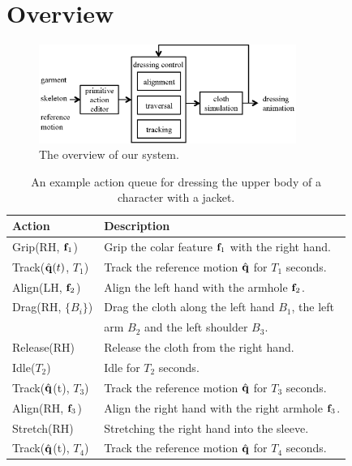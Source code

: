 \section{Overview}

\begin{figure}
  \centering
  \includegraphics[width=3.3in]{images/overview}
  \caption{The overview of our system.}
  \label{fig:overview}
\end{figure}

\begin{table}
  \centering
  \begin{tabular}{|l|l|}
    \hline
    Action & Description \\
    \hline
    Grip(RH, $\mathbf{f}_{1}$) & Grip the colar feature $\mathbf{f}_1$  with the right hand.\\
    Track($\hat{\mathbf{q}}(t)$, $T_1$) & Track the reference motion $\hat{\mathbf{q}}$ for $T_1$ seconds.\\
    Align(LH, $\mathbf{f}_{2}$) & Align the left hand with the armhole $\mathbf{f}_2$.\\
    Drag(RH, $\{B_i\}$) & Drag the cloth along the left hand $B_1$, the left\\
    &                      arm $B_2$ and the left shoulder $B_3$.\\
    Release(RH) & Release the cloth from the right hand.\\
    Idle($T_2$) & Idle for $T_2$ seconds.\\
    Track($\hat{\mathbf{q}}$(t), $T_3$) & Track the reference motion $\hat{\mathbf{q}}$ for $T_3$ seconds.\\
    Align(RH, $\mathbf{f}_{3}$) & Align the right hand with the right armhole $\mathbf{f}_3$.\\
    Stretch(RH) & Stretching the right hand into the sleeve.\\
    Track($\hat{\mathbf{q}}$(t), $T_4$) & Track the reference motion $\hat{\mathbf{q}}$ for $T_4$ seconds. \\
    \hline
  \end{tabular}
  \caption{An example action queue for dressing the upper body of a character with a jacket.}
  \label{table:actionQueue}
\end{table}


